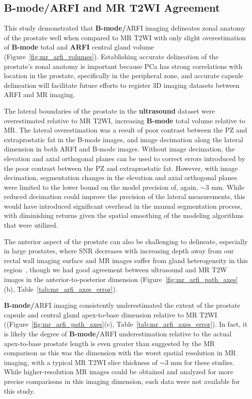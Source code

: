 \subsection{B-mode/ARFI and MR T2WI Agreement}
This study demonstrated that \textbf{B-mode/}ARFI imaging delineates zonal
anatomy of the prostate well when compared to MR T2WI with only slight
overestimation of \textbf{B-mode} total and \textbf{ARFI} central gland volume
(Figure~\ref{fig:mr_arfi_volumes}).  Establishing accurate delineation of the
prostate's zonal anatomy is important because PCa has strong correlations with
location in the prostate, specifically in the peripheral zone, and accurate
capsule delineation will facilitate future efforts to register 3D imaging
datasets between ARFI and MR imaging. 



The lateral boundaries of the prostate in the \textbf{ultrasound} dataset were
overestimated relative to MR T2WI, increasing \textbf{B-mode} total volume
relative to MR. The lateral overestimation was a result of poor contrast
between the PZ and extraprostatic fat in the B-mode images, and image
decimation along the lateral dimension in both ARFI and B-mode images. Without
image decimation, the elevation and axial orthogonal planes can be used to
correct errors introduced by the poor contrast between the PZ and
extraprostatic fat. However, with image decimation, segmentation changes in the
elevation and axial orthogonal planes were limited to the lower bound on the
model precision of, again, $\sim$3 mm.  While reduced decimation could improve
the precision of the lateral measurements, this would have introduced
significant overhead in the manual segmentation process, with diminishing
returns given the spatial smoothing of the modeling algorithms that were
utilized. 



The anterior aspect of the prostate can also be challenging to delineate,
especially in large prostates, where SNR decreases with increasing depth away
from our rectal wall imaging surface and MR images suffer from gland
heterogeneity in this region~\cite{Gupta2013}, though we had good agreement
between ultrasound and MR T2W images in the anterior-to-posterior dimension
(Figure~\ref{fig:mr_arfi_path_axes}(b), Table~\ref{tab:mr_arfi_axes_error}).

\textbf{B-mode/}ARFI imaging consistently underestimated the extent of the
prostate capsule and central gland apex-to-base dimension relative to MR T2WI
((Figure~\ref{fig:mr_arfi_path_axes}(c), Table~\ref{tab:mr_arfi_axes_error}).
In fact, it is likely the degree of \textbf{B-mode/}ARFI underestimation
relative to the actual apex-to-base prostate length is even greater than
suggested by the MR comparison as this was the dimension with the worst spatial
resolution in MR imaging, with a typical MR T2WI slice thickness of $\sim$3 mm
for these studies.  While higher-resolution MR images could be obtained and
analyzed for more precise comparisons in this imaging dimension, such data were
not available for this study. 
